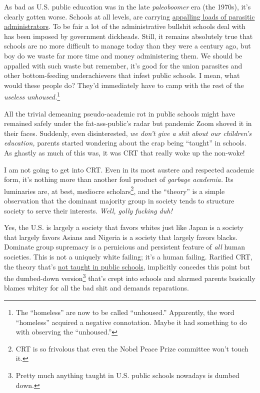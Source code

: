 As bad as U.S. public education was in the late \emph{paleoboomer} era
(the 1970s), it's clearly gotten worse. Schools at all levels, are
carrying
\href{https://www.huffpost.com/entry/higher-ed-administrators-growth_n_4738584}{appalling
loads of parasitic administrators}. To be fair a lot of the
administrative bullshit schools deal with has been imposed by government
dickheads. Still, it remains absolutely true that schools are no more
difficult to manage today than they were a century ago, but boy do we
waste far more time and money administering them. We should be appalled
with such waste but remember, it's good for the union parasites and
other bottom-feeding underachievers that infest public schools. I mean,
what would these people do? They'd immediately have to camp with the
rest of the \emph{useless
unhoused.}\footnote{  The ``homeless'' are now to be called ``unhoused.'' Apparently, the
  word ``homeless'' acquired a negative connotation. Maybe it had
  something to do with observing the
  ``unhoused.''
}

All the trivial demeaning pseudo-academic rot in public schools might
have remained safely under the fat-ass-public's radar but pandemic Zoom
shoved it in their faces. Suddenly, even disinterested, \emph{we don't
give a shit about our children's education,} parents started wondering
about the crap being ``taught'' in schools. As ghastly as much of this
was, it was CRT that really woke up the non-woke!

I am not going to get into CRT. Even in its most austere and respected
academic form, it's nothing more than another foul product of
\emph{garbage academia.} Its luminaries are, at best, mediocre
scholars\footnote{  CRT is so frivolous that even the Nobel Peace Prize committee won't
  touch it.
}, and the ``theory''
is a simple observation that the dominant majority group in society
tends to structure society to serve their interests. \emph{Well, golly
fucking duh!}

Yes, the U.S. is largely a society that favors whites just like Japan is
a society that largely favors Asians and Nigeria is a society that
largely favors blacks. Dominate group supremacy is a pernicious and
persistent feature of \emph{all} human societies. This is not a uniquely
white failing; it's a human failing. Rarified CRT, the theory that's
\href{https://dailycaller.com/2021/07/29/critical-race-theory-law-school-antiracism/}{not
taught in public schools}, implicitly concedes this point but the
dumbed-down version\footnote{  Pretty much anything taught in U.S. public schools nowadays is dumbed
  down.
} that's crept into schools and alarmed parents basically blames whitey for all
the bad shit and demands reparations.

